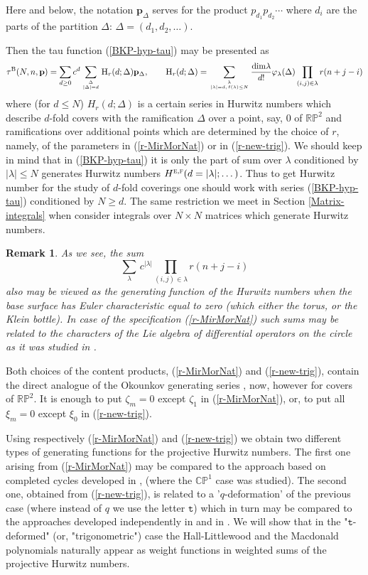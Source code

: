 \documentclass[a4paper,10pt]{article}
\newcommand{\bpow}{\mathbf{p}}
\theoremstyle{plain}
\newtheorem{Remark}{Remark}
\theoremstyle{remark}
\def\be{\begin{equation}}
\def\ee{\end{equation}}
\def\br{\begin{Remark}\rm\small}
\def\er{\end{Remark}}
\begin{document}
Here and below, the notation $\bpow_\Delta$ serves for the product $p_{d_1}p_{d_2}\cdots$ where $d_i$ are the parts
of the partition $\Delta$: $\Delta=(d_1,d_2,\dots)$.

Then the tau function (\ref{BKP-hyp-tau}) may be presented as
\be\label{textsc-H}
\tau^{\rm B}(N,n,\bpow)=\sum_{d\ge 0} c^d \sum_{\Delta\atop |\Delta|=d}  \textsc{H}_r(d;\Delta) \bpow_\Delta,
\qquad\textsc{H}_r(d;\Delta)=\sum_{\lambda\atop |\lambda|=d,\,\ell(\lambda)\le N} \frac{{\rm dim}\lambda}{d!} \varphi_\lambda(\Delta)
\prod_{(i,j)\in\lambda} r(n+j-i)
\ee
where (for $d\le N$) $H_r(d;\Delta)$ is a certain series in Hurwitz numbers which describe $d$-fold covers with the ramification $\Delta$ over a
point, say, $0$ of $\mathbb{RP}^2$ and
ramifications over additional points which are determined by the choice of $r$, namely, of the parameters in (\ref{r-MirMorNat})
or in (\ref{r-new-trig}). We should keep in mind that in (\ref{BKP-hyp-tau}) it is only the part of sum over $\lambda$ 
conditioned by $|\lambda|\le N$ generates Hurwitz numbers $H^{\textsc{e},\textsc{f}}(d=|\lambda|;\dots)$. Thus to get Hurwitz 
number for the study of $d$-fold coverings one should work with series (\ref{BKP-hyp-tau}) conditioned by $N \ge d$. The same 
restriction we meet in Section \ref{Matrix-integrals} when consider integrals over $N\times N$ matrices which generate Hurwitz numbers.

\br
As we see, the sum
\be\label{E=0}
  \sum_{\lambda}\,c^{|\lambda|}\prod_{(i,j)\in\lambda}r(n+j-i)
\ee
also may be viewed as the generating function of the Hurwitz numbers when the base surface has Euler characteristic
equal to zero (which either the torus, or the Klein bottle). In case of the specification (\ref{r-MirMorNat}) such sums may be
related to the characters of the
Lie algebra of differential operators on the circle
as it was studied in \cite{BlochOkounkov}.
\er

Both choices of the content products, (\ref{r-MirMorNat}) and (\ref{r-new-trig}), contain the direct analogue of the
Okounkov generating series \cite{Okounkov-2000},
now, however for covers of $\mathbb{RP}^2$. It is enough to put $\zeta_m=0$ except $\zeta_1$ in (\ref{r-MirMorNat}),
or, to put all $\xi_m=0$ except $\xi_0$ in (\ref{r-new-trig}).



Using respectively (\ref{r-MirMorNat}) and (\ref{r-new-trig})  we obtain two different types of generating functions
for the projective Hurwitz numbers. The first one arising from (\ref{r-MirMorNat})
may be compared to the approach based on completed cycles developed in  \cite{Okounkov-Pand-2006},\cite{AMMN-2011}
(where the $\mathbb{CP}^1$
case was studied).
The second one, obtained from (\ref{r-new-trig}),  is related to a '$q$-deformation'
of the previous case (where instead of $q$ we use the letter $\texttt{t}$) which in turn may be compared to the
approaches
developed independently in \cite{NO-2014} and in \cite{Harnad-October-2014}. We will show that in the "$\texttt{t}$-deformed"
(or, "trigonometric") case the Hall-Littlewood and the Macdonald polynomials naturally appear as weight functions in
weighted sums of the projective Hurwitz numbers.
\end{document}
